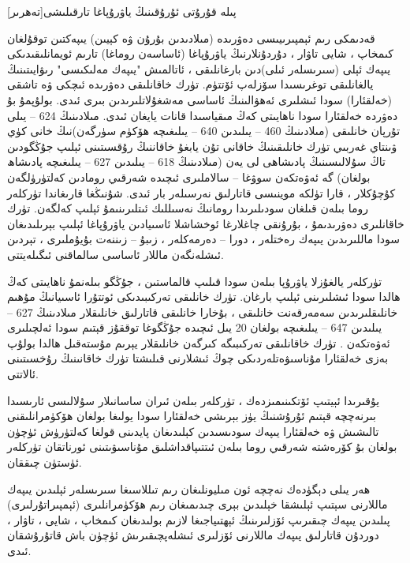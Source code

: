 \documentclass[a4paper]{article}
\begin{document}
\begin{flushright}
پىلە قۇرۇتى ئۇرۇقىنىڭ ياۋرۇپاغا تارقىلىشى[تەھرىر]

قەدىمكى رىم ئېمپىرىيىسى دەۋرىدە (مىلادىدىن بۇرۇن ۋە كېيىن) يىپەكتىن توقۇلغان كىمخاپ ، شايى تاۋار ، دۇردۇنلارنىڭ ياۋرۇپاغا (ئاساسەن روماغا) تارىم ئويمانلىقىدىكى يىپەك ئېلى (سىرىسلەر ئىلى)دىن بارغانلىقى ، ئاتالمىش "يىپەك مەلىكىسى" رىۋايىتىنىڭ يالغانلىقى توغرىسىدا سۆزلەپ ئۆتتۈم. تۈرك خاقانلىقى دەۋرىدە ئىچكى ۋە تاشقى (خەلقئارا) سودا ئىشلىرى ئەھۋالىنىڭ ئاساسى مەشغۇلاتلىرىدىن بىرى ئىدى. بولۇپمۇ بۇ دەۋردە خەلقئارا سودا ناھايىتى كەڭ مىقياسىدا قانات يايغان ئىدى. مىلادىنىڭ 624 – يىلى تۇرپان خانلىقى (مىلادىنىڭ 460 – يىلىدىن 640 – يىلىغىچە ھۆكۈم سۈرگەن)نىڭ خانى كۈي ۋىنتاي غەربىي تۈرك خانلىقىنىڭ خاقانى تۇن يابغۇ خاقاننىڭ رۇقسىتىنى ئېلىپ جۇڭگودىن تاڭ سۇلالىسىنىڭ پادىشاھى لى يەن (مىلادىنىڭ 618 – يىلىدىن 627 – يىلىغىچە پادىشاھ بولغان) گە ئەۋەتكەن سوۋغا – سالاملىرى ئىچىدە شەرقىي رومادىن كەلتۈرۈلگەن كۇچۇكلار ، قارا تۈلكە موينىسى قاتارلىق نەرسىلەر بار ئىدى. شۇنىڭغا قارىغاندا تۈركلەر روما بىلەن قىلغان سودىلىرىدا رومانىڭ نەسىللىك ئىتلىرىنىمۇ ئېلىپ كەلگەن. تۈرك خاقانلىرى دەۋرىدىمۇ ، بۇرۇنقى چاغلارغا ئوخشاشلا ئاسىيادىن ياۋرۇپاغا ئېلىپ بېرىلىدىغان سودا ماللىرىدىن يىپەك رەختلەر ، دورا – دەرمەكلەر ، زىبۇ – زىننەت بۇيۇملىرى ، تېردىن ئىشلەنگەن ماللار ئاساسى سالماقنى ئىگىلەيتتى.



تۈركلەر يالغۇزلا ياۋرۇپا بىلەن سودا قىلىپ قالماستىن ، جۇڭگو بىلەنمۇ ناھايىتى كەڭ ھالدا سودا ئىشلىرىنى ئېلىپ بارغان. تۈرك خانلىقى تەركىبىدىكى ئوتتۇرا ئاسىيانىڭ مۇھىم خانلىقلىرىدىن سەمەرقەنت خانلىقى ، بۇخارا خانلىقى قاتارلىق خانلىقلار مىلادىنىڭ 627 – يىلىدىن 647 – يىلىغىچە بولغان 20 يىل ئىچىدە جۇڭگوغا توققۇز قېتىم سودا ئەلچىلىرى ئەۋەتكەن . تۈرك خاقانلىقى تەركىبىگە كىرگەن خانلىقلار يېرىم مۇستەقىل ھالدا بولۇپ بەزى خەلقئارا مۇناسىۋەتلەردىكى چوڭ ئىشلارنى قىلىشتا تۈرك خاقانىنىڭ رۇخسىتىنى ئالاتتى.



يۇقىرىدا ئېيتىپ ئۆتكىنىمىزدەك ، تۈركلەر بىلەن ئىران ساسانىلار سۇلالىسى ئارىسىدا بىرنەچچە قېتىم ئۇرۇشنىڭ يۈز بېرىشى خەلقئارا سودا يولىغا بولغان ھۆكۈمرانلىقنى تالىشىش ۋە خەلقئارا يىپەك سودىسىدىن كېلىدىغان پايدىنى قولغا كەلتۈرۈش ئۈچۈن بولغان بۇ كۆرەشتە شەرقىي روما بىلەن ئىتتىپاقداشلىق مۇناسىۋىتىنى ئورناتقان تۈركلەر ئۈستۈن چىققان.



ھەر يىلى دېگۈدەك نەچچە ئون مىليونلىغان رىم تىللاسىغا سىرىسلەر ئېلىدىن يىپەك ماللارنى سېتىپ ئېلىشقا خېلىدىن بېرى چىدىمىغان رىم ھۆكۈمرانلىرى (ئېمپىراتۇرلىرى) پىلىدىن يىپەك چىقىرىپ ئۆزلىرىنىڭ ئېھتىياجىغا لازىم بولىدىغان كىمخاپ ، شايى ، تاۋار ، دوردۇن قاتارلىق يىپەك ماللارنى ئۆزلىرى ئىشلەپچىقىرىش ئۈچۈن باش قاتۇرۇشقان ئىدى.




\end{flushright}
\end{document}
